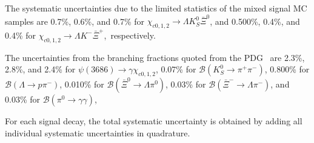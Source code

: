 \documentclass[amsmath,amssymb,twocolumn,prd,floatfix,showpacs,nofootinbib]{revtex4-1}
\begin{document}
The systematic uncertainties due to the limited statistics of the mixed signal MC samples
are 0.7\%, 0.6\%, and 0.7\% for  $\chi_{c0,1,2}\to  \Lambda K^0_S\bar \Xi^0$,
and 0.500\%, 0.4\%, and 0.4\% for $\chi_{c0,1,2}\to \Lambda K^-\bar \Xi^+$,~respectively.

The uncertainties from the branching fractions quoted from the PDG~\cite{ref::pdg2024} are 2.3\%, 2.8\%, and 2.4\% for $\psi(3686)\to \gamma\chi_{c0,1,2}$,
0.07\% for $\mathcal{B}(K^{0}_{S} \to \pi^+ \pi^-)$, 0.800\% for $\mathcal{B}(\Lambda \to p \pi^-)$, 0.010\% for $\mathcal{B}(\bar{\Xi}^0 \to \Lambda\pi^0)$, 0.03\% for $\mathcal{B}(\bar{\Xi}^- \to \Lambda \pi^-)$, and 0.03\% for $\mathcal{B}(\pi^0 \to \gamma \gamma)$,  

For each signal decay, the total systematic uncertainty is obtained by adding all individual systematic uncertainties in quadrature.
\end{document}
